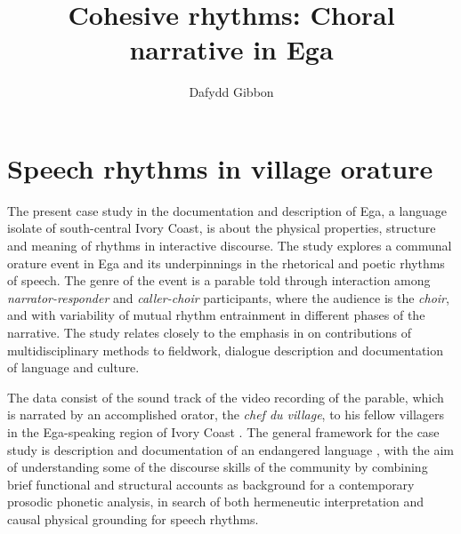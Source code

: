 \documentclass[output=paper,colorlinks,citecolor=brown]{langscibook}
\author{Dafydd Gibbon\orcid{0000—0002—9825—5516}\affiliation{Bielefeld University}}
\title{Cohesive rhythms: Choral narrative in Ega}
\begin{document}
\maketitle


\section{Speech rhythms in village orature}

The present case study in the documentation and description of Ega, a language isolate of south-central Ivory Coast, is about the physical properties, structure and meaning of rhythms in interactive discourse. The study explores a communal orature event in Ega and its underpinnings in the rhetorical and poetic rhythms of speech. The genre of the event is a parable told through interaction among \textit{narrator-responder} and \textit{caller-choir} participants, where the audience is the \textit{choir}, and with variability of mutual rhythm entrainment in different phases of the narrative. The study relates closely to the emphasis in  on contributions of multidisciplinary methods to fieldwork, dialogue description and documentation of language and culture.

The data consist of the sound track of the video recording of the parable, which is narrated by an accomplished orator, the \textit{chef du village}, to his fellow villagers in the Ega-speaking region of Ivory Coast \citep{rossinigibbon2011}. The general framework for the case study is description and documentation of an endangered language \citep{gibbonbowbirdhughes2004}, with the aim of understanding some of the discourse skills of the community by combining brief functional and structural accounts as background for a contemporary prosodic phonetic analysis, in search of both hermeneutic interpretation and causal physical grounding for speech rhythms.
\end{document}

